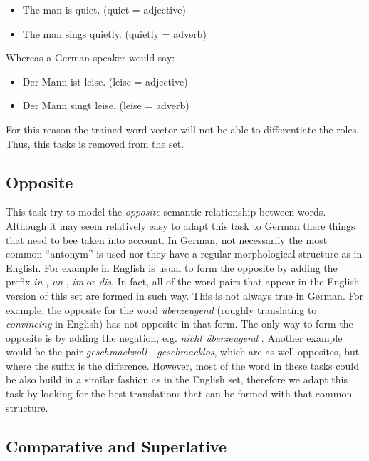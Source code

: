 \begin{itemize}
\item The man is quiet. (quiet = adjective)
\item The man sings quietly. (quietly = adverb)
\end{itemize}

Whereas a German speaker would say:

\begin{itemize}
\item Der Mann ist leise. (leise = adjective)
\item Der Mann singt leise. (leise = adverb)
\end{itemize}

For this reason the trained word vector will not be able to differentiate the
roles. Thus, this tasks is removed from the set. 

\subsection{Opposite}
\label{sec:sub_sec_opposite}
This task try to model the \emph{opposite} semantic relationship between words.
Although it may seem relatively easy to adapt this task to German there
things that need to bee taken into account. In German,  not necessarily the
most common ``antonym'' is used nor they have a regular morphological
structure as in English. For example  in English is usual to form the
opposite by adding the prefix \textit{in} ,  \textit{un} , \textit{im} or
\textit{dis}. In fact, all of the word pairs that appear in the English
version of this set are formed in such way. This is not always true in
German. For example, the opposite for the word  \textit{\"{u}berzeugend} (roughly
translating to \emph{convincing} in English) has not opposite in that form.
The only way to form the opposite is by adding the negation, e.g.
\textit{nicht  \"{u}berzeugend }. Another example would be the pair
\textit{geschmackvoll} - \textit{geschmacklos}, which are as well opposites,
but where the suffix is the difference.
However, most of the word in these tasks could be also build in a similar
fashion as in the English set, therefore we adapt this task by looking for
the best translations that can be formed with that common structure.

\subsection{Comparative and Superlative}
\label{sec:sub_sec_comparative_sup}

